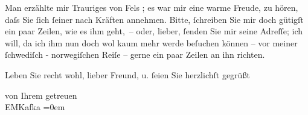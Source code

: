 \pstart
           Man erzählte mir Trauriges von Fels ; es war mir
          eine warme Freude, zu hören, daſs Sie{ }ſich{ }ſeiner nach Kräften annehmen. Bitte,{ }ſchreiben
          Sie mir doch gütigſt ein paar Zeilen, wie es ihm geht, – oder, lieber,{ }ſenden Sie mir
          seine Adreſſe; ich will, da ich ihm nun doch wol kaum mehr werde beſuchen können – vor
          meiner ſchwediſch - norwegiſchen Reiſe – gerne ein paar Zeilen an ihn richten.\pend
           
\pstart
           Leben Sie recht wohl, lieber Freund, u.{ }ſeien Sie herzlichſt gegrüßt\pend
           
\pstart
           von Ihrem getreuen {\\[\baselineskip]}\spacefill\mbox{EMKafka}\pend
           \leftskip=0em{}\endnumbering{}  \newcommand{\dateiname}{L00187}\newcommand{\titel}{Eduard Michael Kafka an Arthur Schnitzler, 7. 3. 1893}\newcommand{\editorInnen}{Martin Anton Müller und Gerd-Hermann Susen}
